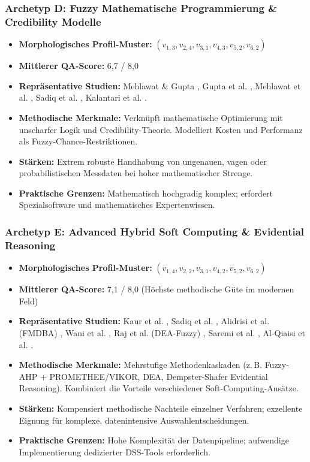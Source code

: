 \subsubsection{Archetyp D: Fuzzy Mathematische Programmierung \& Credibility Modelle}
\begin{itemize}
    \item \textbf{Morphologisches Profil-Muster:} $(v_{1,3}, v_{2,4}, v_{3,1}, v_{4,3}, v_{5,2}, v_{6,2})$
    \item \textbf{Mittlerer QA-Score:} 6,7 / 8,0
    \item \textbf{Repräsentative Studien:} Mehlawat \& Gupta \cite{6YJHIVHG, B7ZTQCZZ}, Gupta et al. \cite{VRTXHQI7}, Mehlawat et al. \cite{JX4RDRDU}, Sadiq et al. \cite{P9SATBH5}, Kalantari et al. \cite{UFCEV52H}.
    \item \textbf{Methodische Merkmale:} Verknüpft mathematische Optimierung mit unscharfer Logik und Credibility-Theorie. Modelliert Kosten und Performanz als Fuzzy-Chance-Restriktionen.
    \item \textbf{Stärken:} Extrem robuste Handhabung von ungenauen, vagen oder probabilistischen Messdaten bei hoher mathematischer Strenge.
    \item \textbf{Praktische Grenzen:} Mathematisch hochgradig komplex; erfordert Spezialsoftware und mathematisches Expertenwissen.
\end{itemize}

\subsubsection{Archetyp E: Advanced Hybrid Soft Computing \& Evidential Reasoning}
\begin{itemize}
    \item \textbf{Morphologisches Profil-Muster:} $(v_{1,4}, v_{2,2}, v_{3,1}, v_{4,2}, v_{5,2}, v_{6,2})$
    \item \textbf{Mittlerer QA-Score:} 7,1 / 8,0 (Höchste methodische Güte im modernen Feld)
    \item \textbf{Repräsentative Studien:} Kaur et al. \cite{NZJEEPAC}, Sadiq et al. \cite{QNWK8SAP, JT5X3FIG, DFASRUVC, LNQHES84}, Alidrisi et al. (FMDBA) \cite{FVINCQ89}, Wani et al. \cite{8KF4HAZS}, Raj et al. (DEA-Fuzzy) \cite{YVWGHAWQ}, Saremi et al. \cite{LYMHTPXS}, Al-Qiaisi et al. \cite{5BBYQCJB}.
    \item \textbf{Methodische Merkmale:} Mehrstufige Methodenkaskaden (z.\,B. Fuzzy-AHP + PROMETHEE/VIKOR, DEA, Dempster-Shafer Evidential Reasoning). Kombiniert die Vorteile verschiedener Soft-Computing-Ansätze.
    \item \textbf{Stärken:} Kompensiert methodische Nachteile einzelner Verfahren; exzellente Eignung für komplexe, datenintensive Auswahlentscheidungen.
    \item \textbf{Praktische Grenzen:} Hohe Komplexität der Datenpipeline; aufwendige Implementierung dedizierter DSS-Tools erforderlich.
\end{itemize}

